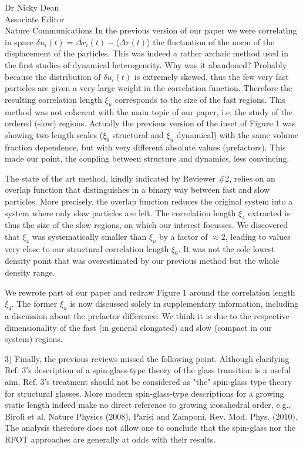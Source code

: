 \documentclass[a4paper, rebuttal, parskip=true, firsthead=false, fromemail=true, foldmarks=false]{scrlttr2}
\begin{document}
\begin{letter}{Dr Nicky Dean\\
Associate Editor\\
Nature Communications}
In the previous version of our paper we were correlating in space $\delta u_i(t) = \Delta r_i(t)-\langle\Delta r(t)\rangle$ the fluctuation of the norm of the displacement of the particles. This was indeed a rather archaic method used in the first studies of dynamical heterogeneity. Why was it abandoned? Probably because the distribution of $\delta u_i(t)$ is extremely skewed, thus the few very fast particles are given a very large weight in the correlation function. Therefore the resulting correlation length $\xi_u$ corresponds to the size of the fast regions. This method was not coherent with the main topic of our paper, i.e. the study of the ordered (slow) regions. Actually the previous version of the inset of Figure 1 was showing two length scales ($\xi_6$ structural and $\xi_u$ dynamical) with the same volume fraction dependence, but with very different absolute values (prefactors). This made our point, the coupling between structure and dynamics, less convincing.

The state of the art method, kindly indicated by Reviewer \#2, relies on an overlap function that distinguishes in a binary way between fast and slow particles. More precisely, the overlap function reduces the original system into a system where only slow particles are left. The correlation length $\xi_4$ extracted is thus the size of the slow regions, on which our interest focusses. We discovered that $\xi_4$ was systematically smaller than $\xi_u$ by a factor of $\approx 2$, leading to values very close to our structural correlation length $\xi_6$. It was not the sole lowest density point that was overestimated by our previous method but the whole density range.

We rewrote part of our paper and redraw Figure 1 around the correlation length $\xi_4$. The former $\xi_u$ is now discussed solely in supplementary information, including a discussion about the prefactor difference. We think it is due to the respective dimensionality of the fast (in general elongated) and slow (compact in our system) regions.

\begin{quotationi}
3) Finally, the previous reviews missed the following point. Although clarifying Ref. 3's description of a spin-glass-type theory of the glass transition is a useful aim, Ref. 3's treatment should not be considered as "the" spin-glass type theory for structural glasses. More modern spin-glass-type descriptions for a growing static length indeed make no direct reference to growing icosahedral order, e.g., Biroli et al. Nature Physics (2008), Parisi and Zamponi, Rev. Mod. Phys. (2010). The analysis therefore does not allow one to conclude that the spin-glass nor the RFOT approaches are generally at odds with their results.
\end{quotationi}


\end{letter}
\end{document}
